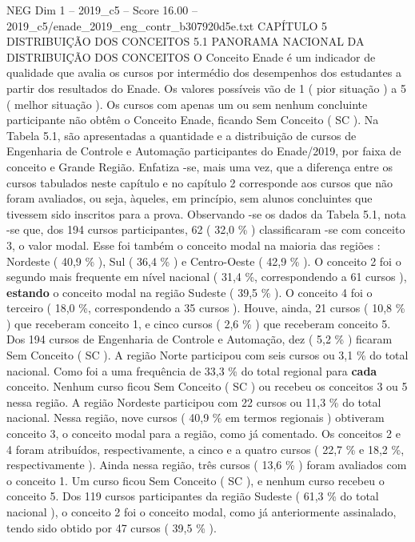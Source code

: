 \begin{textsample}{NEG Dim 1 – 2019\_c5 – Score 16.00 – 2019\_c5/enade\_2019\_eng\_contr\_b307920d5e.txt}  \label{ex:f1_neg_395}
CAPÍTULO 5 DISTRIBUIÇÃO DOS CONCEITOS 5.1 PANORAMA NACIONAL DA DISTRIBUIÇÃO DOS CONCEITOS O Conceito Enade é um indicador de qualidade que avalia os cursos por intermédio dos desempenhos dos estudantes a partir dos resultados do Enade.
Os valores possíveis vão de 1 ( pior situação ) a 5 ( melhor situação ).
Os cursos com apenas um ou sem nenhum concluinte participante não obtêm o Conceito Enade, ficando Sem Conceito ( SC ).
Na Tabela 5.1, são apresentadas a quantidade e a distribuição de cursos de Engenharia de Controle e Automação participantes do Enade/2019, por faixa de conceito e Grande Região.
Enfatiza -se, mais uma vez, que a diferença entre os cursos tabulados neste capítulo e no capítulo 2 corresponde aos cursos que não foram avaliados, ou seja, àqueles, em princípio, sem alunos concluintes que tivessem sido inscritos para a prova.
Observando -se os dados da Tabela 5.1, nota -se que, dos 194 cursos participantes, 62 ( 32,0 \% ) classificaram -se com conceito 3, o valor modal.
Esse foi também o conceito modal na maioria das regiões : Nordeste ( 40,9 \% ), Sul ( 36,4 \% ) e Centro-Oeste ( 42,9 \% ).
O conceito 2 foi o segundo mais frequente em nível nacional ( 31,4 \%, correspondendo a 61 cursos ), \textbf{estando} o conceito modal na região Sudeste ( 39,5 \% ).
O conceito 4 foi o terceiro ( 18,0 \%, correspondendo a 35 cursos ).
Houve, ainda, 21 cursos ( 10,8 \% ) que receberam conceito 1, e cinco cursos ( 2,6 \% ) que receberam conceito 5.
Dos 194 cursos de Engenharia de Controle e Automação, dez ( 5,2 \% ) ficaram Sem Conceito ( SC ).
A região Norte participou com seis cursos ou 3,1 \% do total nacional.
Como foi a uma frequência de 33,3 \% do total regional para \textbf{cada} conceito.
Nenhum curso ficou Sem Conceito ( SC ) ou recebeu os conceitos 3 ou 5 nessa região.
A região Nordeste participou com 22 cursos ou 11,3 \% do total nacional.
Nessa região, nove cursos ( 40,9 \% em termos regionais ) obtiveram conceito 3, o conceito modal para a região, como já comentado.
Os conceitos 2 e 4 foram atribuídos, respectivamente, a cinco e a quatro cursos ( 22,7 \% e 18,2 \%, respectivamente ).
Ainda nessa região, três cursos ( 13,6 \% ) foram avaliados com o conceito 1.
Um curso ficou Sem Conceito ( SC ), e nenhum curso recebeu o conceito 5.
Dos 119 cursos participantes da região Sudeste ( 61,3 \% do total nacional ), o conceito 2 foi o conceito modal, como já anteriormente assinalado, tendo sido obtido por 47 cursos ( 39,5 \% ).

\end{textsample}
